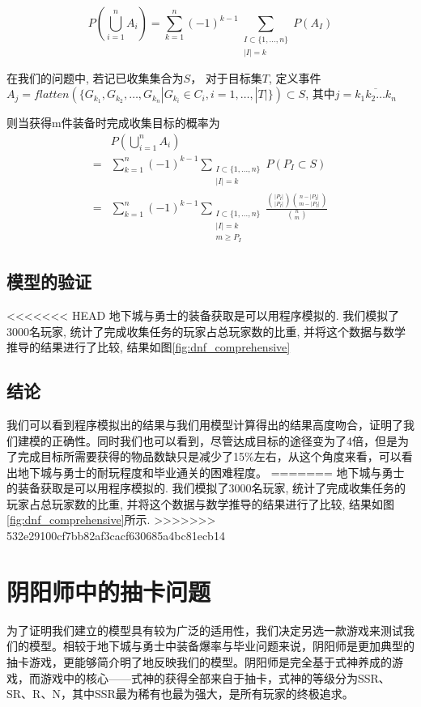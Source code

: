 \documentclass[10pt,journal,compsoc]{IEEEtran}
\begin{document}
  $$
  P(\bigcup_{i=1}^n A_i) = \sum\limits_{k=1}^n (-1)^{k-1} \sum_{\substack{I \subset \{ 1,\dots, n \}\\ |I|=k}} P(A_I)
  $$
  
  在我们的问题中, 若记已收集集合为$S$， 对于目标集$T$, 定义事件$A_j = flatten(\{G_{k_1}, G_{k_2}, \dots, G_{k_n} | G_{k_i} \in C_i, i = 1,\dots,|T|\}) \subset S$, 其中$j=\overline{k_1 k_2 \dots k_n}$
  
  则当获得m件装备时完成收集目标的概率为
  \begin{equation*}
    \begin{split}
      & P(\bigcup_{i=1}^n A_i) \\
      = & \sum\limits_{k=1}^n (-1)^{k-1} \sum_{\substack{I \subset \{ 1,\dots, n \}\\ |I|=k}} P(P_I\subset S)\\
      = & \sum\limits_{k=1}^n (-1)^{k-1} \sum_{\substack{I \subset \{ 1,\dots, n \}\\ |I|=k \\ m \geq P_I}} \frac{\binom{|P_I|}{|P_I|} \binom{n-|P_I|}{m-|P_I|}}{\binom{n}{m}}
    \end{split}
  \end{equation*}

  \subsection{模型的验证}
<<<<<<< HEAD
    地下城与勇士的装备获取是可以用程序模拟的. 我们模拟了3000名玩家, 统计了完成收集任务的玩家占总玩家数的比重, 并将这个数据与数学推导的结果进行了比较, 结果如图\ref{fig:dnf_comprehensive}


  \subsection{结论}
    我们可以看到程序模拟出的结果与我们用模型计算得出的结果高度吻合，证明了我们建模的正确性。同时我们也可以看到，尽管达成目标的途径变为了4倍，但是为了完成目标所需要获得的物品数缺只是减少了15\%左右，从这个角度来看，可以看出地下城与勇士的耐玩程度和毕业通关的困难程度。
=======
    地下城与勇士的装备获取是可以用程序模拟的. 我们模拟了3000名玩家, 统计了完成收集任务的玩家占总玩家数的比重, 并将这个数据与数学推导的结果进行了比较, 结果如图\ref{fig:dnf_comprehensive}所示. 
>>>>>>> 532e29100cf7bb82af3cacf630685a4bc81ecb14
    
    


\section{阴阳师中的抽卡问题}
为了证明我们建立的模型具有较为广泛的适用性，我们决定另选一款游戏来测试我们的模型。相较于地下城与勇士中装备爆率与毕业问题来说，阴阳师是更加典型的抽卡游戏，更能够简介明了地反映我们的模型。阴阳师是完全基于式神养成的游戏，而游戏中的核心——式神的获得全部来自于抽卡，式神的等级分为SSR、SR、R、N，其中SSR最为稀有也最为强大，是所有玩家的终极追求。
\end{document}
